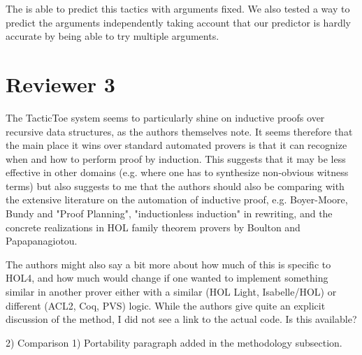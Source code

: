 \documentclass[]{scrartcl}
\begin{document}
The is able to predict this tactics with arguments fixed. We also tested a way 
to predict the arguments independently taking account that our predictor is 
hardly accurate by being able to try multiple arguments.



\section*{Reviewer 3}

\begin{leftbar}
The TacticToe system seems to particularly shine on inductive proofs over
recursive data structures, as the authors themselves note. It seems
therefore that the main place it wins over standard automated provers is
that it can recognize when and how to perform proof by induction. This
suggests that it may be less effective in other domains (e.g. where one has
to synthesize non-obvious witness terms) but also suggests to me that the
authors should also be comparing with the extensive literature on the
automation of inductive proof, e.g. Boyer-Moore, Bundy and "Proof
Planning", "inductionless induction" in rewriting, and the concrete
realizations in HOL family theorem provers by Boulton and Papapanagiotou.

The authors might also say a bit more about how much of this is specific to
HOL4, and how much would change if one wanted to implement something
similar in another prover either with a similar (HOL Light, Isabelle/HOL)
or different (ACL2, Coq, PVS) logic. While the authors give quite an
explicit discussion of the method, I did not see a link to the actual code.
Is this available?
\end{leftbar}

2) Comparison
1) Portability paragraph added in the methodology subsection.
\end{document}
